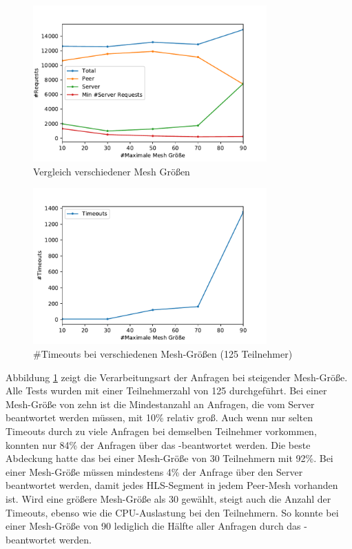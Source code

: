 \begin{figure}[!h]
	\centering
	\includegraphics[width=0.8\textwidth]{figures/mesh_comparison}
	\caption[Vergleich verschiedener Mesh Größen]{Vergleich verschiedener Mesh Größen}
	\label{fig:mesh_comparison}
\end{figure}

\begin{figure}[!h]
	\centering
	\includegraphics[width=0.8\textwidth]{figures/timeouts_meshed}
	\caption[\#Timeouts bei verschiedenen Mesh-Größen]{\#Timeouts bei verschiedenen Mesh-Größen (125 Teilnehmer)}
	\label{fig:timeouts_meshed}
\end{figure}

Abbildung \ref{fig:mesh_comparison} zeigt die Verarbeitungsart der Anfragen bei steigender Mesh-Größe. Alle Tests wurden mit einer Teilnehmerzahl von 125 durchgeführt. Bei einer Mesh-Größe von zehn ist die Mindestanzahl an Anfragen, die vom Server beantwortet werden müssen, mit 10\% relativ groß. Auch wenn nur selten Timeouts durch zu viele Anfragen bei demselben Teilnehmer vorkommen, konnten nur 84\% der Anfragen über das \pTp-\cdn beantwortet werden. Die beste Abdeckung hatte das \cdn bei einer Mesh-Größe von 30 Teilnehmern mit 92\%. Bei einer Mesh-Größe müssen mindestens 4\% der Anfrage über den Server beantwortet werden, damit jedes HLS-Segment in jedem Peer-Mesh vorhanden ist. Wird eine größere Mesh-Größe als 30 gewählt, steigt auch die Anzahl der Timeouts, ebenso wie die CPU-Auslastung bei den Teilnehmern. So konnte bei einer Mesh-Größe von 90 lediglich die Hälfte aller Anfragen durch das \pTp-\cdn beantwortet werden.


